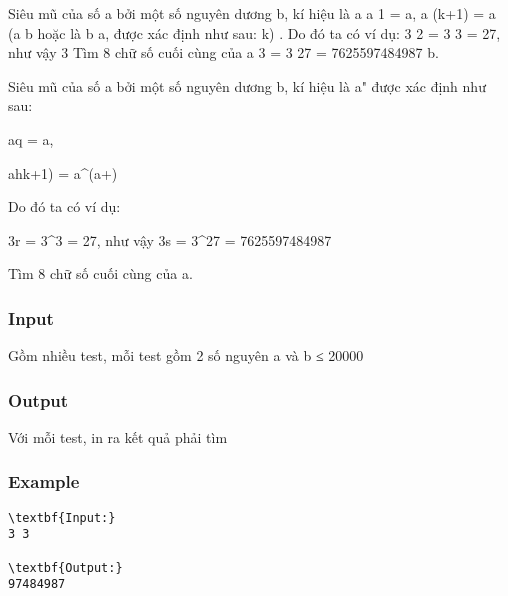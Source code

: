



     Siêu mũ của số a bởi một số nguyên dương b, kí hiệu là a       a 1 = a,       a (k+1) = a (a       b hoặc là b a, được xác định như sau:       k)       .       Do đó ta có ví dụ: 3       2 = 3 3 = 27, như vậy 3       Tìm 8 chữ số cuối cùng của a       3 = 3 27 = 7625597484987       b.    

   Siêu mũ của số a bởi một số nguyên dương b, kí hiệu là a^^b được xác định như sau:  

   a^^1 = a,  

   a^^(k+1) = a^(a^^k)  

   Do đó ta có ví dụ:  

   3^^2 = 3^3 = 27, như vậy 3^^3 = 3^27 = 7625597484987  

   Tìm 8 chữ số cuối cùng của a.  



\subsubsection{   Input  }

   Gồm nhiều test, mỗi test gồm 2 số nguyên a và b ≤ 20000  

\subsubsection{   Output  }

   Với mỗi test, in ra kết quả phải tìm  

\subsubsection{   Example  }
\begin{verbatim}
\textbf{Input:}
3 3

\textbf{Output:}
97484987
\end{verbatim}
